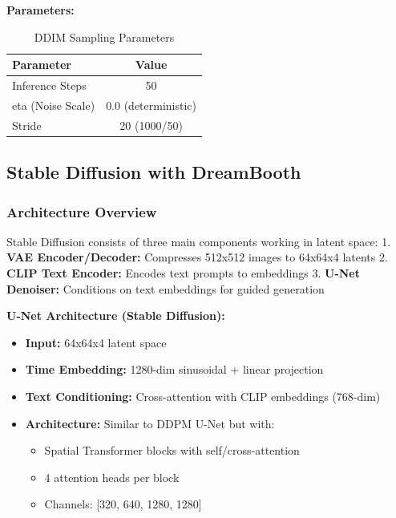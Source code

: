 \documentclass[a4paper,12pt]{article}
\begin{document}
\textbf{Parameters:}
\begin{table}[H]
    \centering
    \begin{tabular}{lc}
        \toprule
        \textbf{Parameter} & \textbf{Value} \\
        \midrule
        Inference Steps & 50 \\
        eta (Noise Scale) & 0.0 (deterministic) \\
        Stride & 20 (1000/50) \\
        \bottomrule
    \end{tabular}
    \caption{DDIM Sampling Parameters}
\end{table}

\subsection{Stable Diffusion with DreamBooth}

\subsubsection{Architecture Overview}
Stable Diffusion consists of three main components working in latent space:
1. \textbf{VAE Encoder/Decoder:} Compresses 512x512 images to 64x64x4 latents
2. \textbf{CLIP Text Encoder:} Encodes text prompts to embeddings
3. \textbf{U-Net Denoiser:} Conditions on text embeddings for guided generation

\textbf{U-Net Architecture (Stable Diffusion):}
\begin{itemize}
    \item \textbf{Input:} 64x64x4 latent space
    \item \textbf{Time Embedding:} 1280-dim sinusoidal + linear projection
    \item \textbf{Text Conditioning:} Cross-attention with CLIP embeddings (768-dim)
    \item \textbf{Architecture:} Similar to DDPM U-Net but with:
        \begin{itemize}
            \item Spatial Transformer blocks with self/cross-attention
            \item 4 attention heads per block
            \item Channels: [320, 640, 1280, 1280]
        \end{itemize}
\end{itemize}
\end{document}

